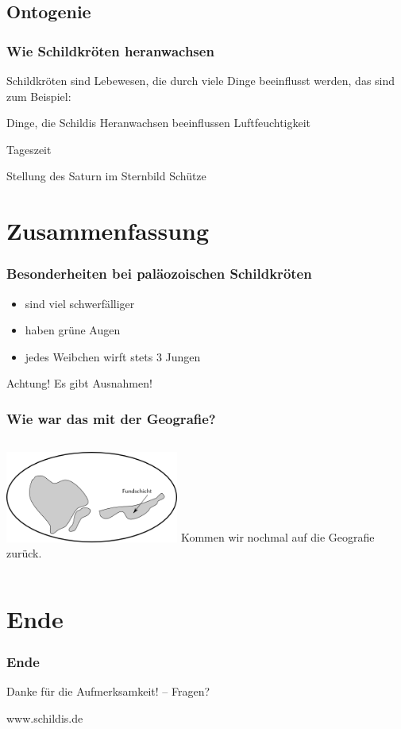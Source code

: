 \documentclass{beamer}
\begin{document}
\subsection{Ontogenie}

\begin{frame}
	\frametitle{Wie Schildkröten heranwachsen}

	Schildkröten sind Lebewesen, die durch viele Dinge beeinflusst werden, das sind zum Beispiel:
	
	\begin{exampleblock}{Dinge, die Schildis Heranwachsen beeinflussen} %
		Luftfeuchtigkeit
		
		Tageszeit
		
		Stellung des Saturn im Sternbild Schütze
	\end{exampleblock}

\end{frame}

\section{Zusammenfassung}

\begin{frame}
	\frametitle{Besonderheiten bei paläozoischen Schildkröten}
	
	\begin{itemize}
		\item sind viel schwerfälliger
		\item haben grüne Augen
		\item jedes Weibchen wirft stets 3 Jungen
	\end{itemize}
	
	\begin{alertblock}{Achtung!} %
		Es gibt Ausnahmen!
	\end{alertblock}
\end{frame}

\begin{frame}
	\frametitle{Wie war das mit der Geografie?}
	
	\begin{columns} %
		\column[c]{6cm} %
			\includegraphics[height=3cm]{Karte.png}
			Kommen wir nochmal auf die Geografie zurück.
	\end{columns}	
\end{frame}

\section{Ende}

\begin{frame}
	\frametitle{Ende}
	\begin{center}
	Danke für die Aufmerksamkeit! -- Fragen? \vspace{0.3cm}

	
	{\footnotesize www.schildis.de}
	\end{center}
\end{frame}
\end{document}
